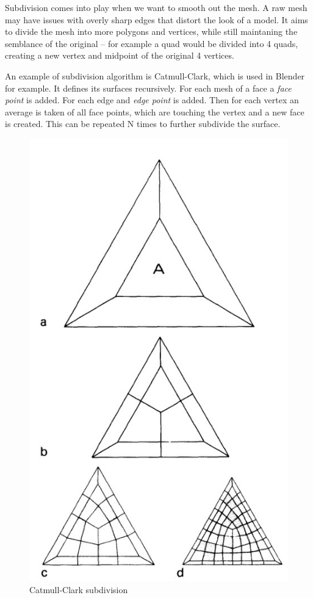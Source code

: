 \documentclass[12pt,a4paper,titlepage,final]{report}
\begin{document}
Subdivision comes into play when we want to smooth out the mesh. A raw mesh may have issues with overly sharp edges that distort the look of a model. It aims to divide the mesh into more polygons and vertices, while still maintaning the semblance of the original -- for example a quad would be divided into 4 quads, creating a new vertex and midpoint of the original 4 vertices. \cite{subdivision}

An example of subdivision algorithm is Catmull-Clark, which is used in Blender for example. It defines its surfaces recursively. For each mesh of a face a \textit{face point} is added. For each edge and \textit{edge point} is added. Then for each vertex an average is taken of all face points, which are touching the vertex and a new face is created. This can be repeated N times to further subdivide the surface. \cite{CATMULL1978350}

\begin{figure}[H]
    \centering
    \includegraphics{images/subdiv_clark.jpg}
    \caption{Catmull-Clark subdivision \cite{CATMULL1978350}}
    \label{fig:cat_clark_subdiv}
\end{figure}
\end{document}
